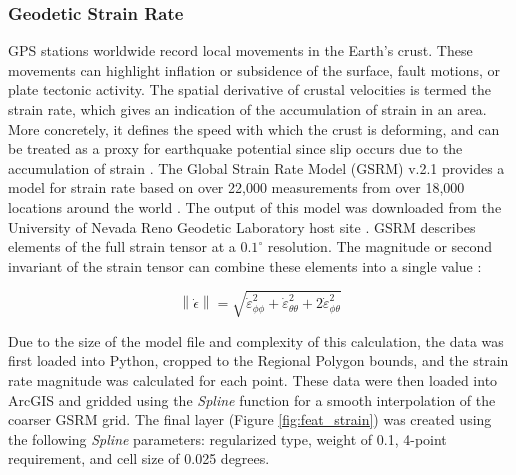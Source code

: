 \subsubsection{Geodetic Strain Rate}

GPS stations worldwide record local movements in the Earth’s crust. These movements can highlight inflation or subsidence of the surface, fault motions, or plate tectonic activity. The spatial derivative of crustal velocities is termed the strain rate, which gives an indication of the accumulation of strain in an area. More concretely, it defines the speed with which the crust is deforming, and can be treated as a proxy for earthquake potential since slip occurs due to the accumulation of strain \citep{gem_strain_2014}. The Global Strain Rate Model (GSRM) v.2.1 provides a model for strain rate based on over 22,000 measurements from over 18,000 locations around the world \citep{kreemer_geodetic_2014}. The output of this model was downloaded from the University of Nevada Reno Geodetic Laboratory host site \citep{kreemer_global_2020}. GSRM describes elements of the full strain tensor at a $0.1^\circ$ resolution. The magnitude or second invariant of the strain tensor can combine these elements into a single value \citep{kreemer_geodetic_2014}:

\begin{equation}\label{eq:strainratemagnitude}
\left\lVert\dot{\epsilon}\right\rVert = \sqrt{\dot{\varepsilon}_{\phi\phi}^2+\dot{\varepsilon}_{\theta\theta}^2+2\dot{\varepsilon}_{\phi\theta}^2}
\end{equation}

Due to the size of the model file and complexity of this calculation, the data was first loaded into Python, cropped to the Regional Polygon bounds, and the strain rate magnitude was calculated for each point. These data were then loaded into ArcGIS and gridded using the \textit{Spline} function for a smooth interpolation of the coarser GSRM grid. The final layer (Figure \ref{fig:feat_strain}) was created using the following \textit{Spline} parameters: regularized type, weight of 0.1, 4-point requirement, and cell size of 0.025 degrees.

